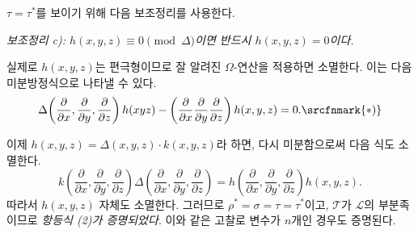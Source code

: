 
$\tau=\tau^*$를 보이기 위해 다음 보조정리를 사용한다.

\emph{보조정리 c): $h(x,y,z)\equiv0\pmod{\Delta}$이면 반드시 $h(x,y,z)=0$이다.}

실제로 $h(x,y,z)$는 편극형이므로 잘 알려진 $\Omega$-연산을 적용하면 소멸한다. 이는 다음 미분방정식으로 나타낼 수 있다.
\[
  \Delta\!\left(\frac{\partial}{\partial x},\frac{\partial}{\partial y},\frac{\partial}{\partial z}\right)h(xyz)
  -\left(\frac{\partial}{\partial x}\frac{\partial}{\partial y}\frac{\partial}{\partial z}\right)h(x,y,z)=0.\srcfnmark{*)}
\]

이제 $h(x,y,z)=\Delta(x,y,z)\cdot k(x,y,z)$라 하면, 다시 미분함으로써 다음 식도 소멸한다.
\[
  k\!\left(\frac{\partial}{\partial x},\frac{\partial}{\partial y},\frac{\partial}{\partial z}\right)
  \Delta\!\left(\frac{\partial}{\partial x},\frac{\partial}{\partial y},\frac{\partial}{\partial z}\right)
  =
  h\!\left(\frac{\partial}{\partial x},\frac{\partial}{\partial y},\frac{\partial}{\partial z}\right)h(x,y,z).
\]
따라서 $h(x,y,z)$ 자체도 소멸한다. 그러므로 $\rho^*=\sigma=\tau=\tau^*$이고, $\mathcal T$가 $\mathcal L$의 부분족이므로 \emph{항등식 (2)가 증명되었다}. 이와 같은 고찰로 변수가 $n$개인 경우도 증명된다.
